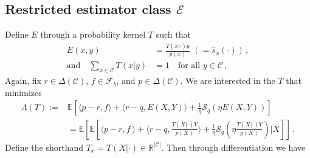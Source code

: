 \documentclass{article}
\theoremstyle{plain}
\theoremstyle{definition}
\theoremstyle{remark}
\newcommand{\R}{\mathbb R}
\newcommand{\E}{\mathbb E}
\newcommand{\cE}{\mathcal E}
\newcommand{\cF}{\mathcal F}
\newcommand{\cS}{\mathcal S}
\newcommand{\cC}{\mathcal C}
\theoremstyle{definition}
\begin{document}
\subsection{Restricted estimator class $\cE$}
Define $E$ through a probability kernel $T$ such that
\begin{align*}
    E(x,y)                  & = \frac{T(x|\cdot) y}{p(x)} \,\,(= \hat{s}_x(\cdot))\,, \\
    \text{and} \quad
    \sum_{x \in \cC} T(x|y) & = 1\quad \text{for all } y \in \cC\,,
\end{align*}
Again, fix $r \in \Delta(\cC)$, $f \in \cF_b$, and $p \in \Delta(\cC)$.
We are interested in the $T$ that minimizes
\begin{align*}
    \Lambda(T) := & \E\left[
        \langle p - r, f \rangle
        + \langle r - q, E(X, Y) \rangle
        + \frac{1}{\eta} \cS_q(\eta E(X, Y))
        \right]
    \\
                  & = \E\left[
        \E\left[
            \langle p - r, f \
            \rangle
            + \langle r - q, \tfrac{T(X|\cdot) Y}{p(X)} \rangle
            + \frac{1}{\eta} \cS_q\left(\eta \tfrac{T(X|\cdot) Y}{p(X)}\right)
            \bigg| X
            \right]
        \right]\,.
\end{align*}
Define the shorthand $T_x = T(X| \cdot) \in \R^{|\cC|}$.
Then through differentiation we have
\end{document}
